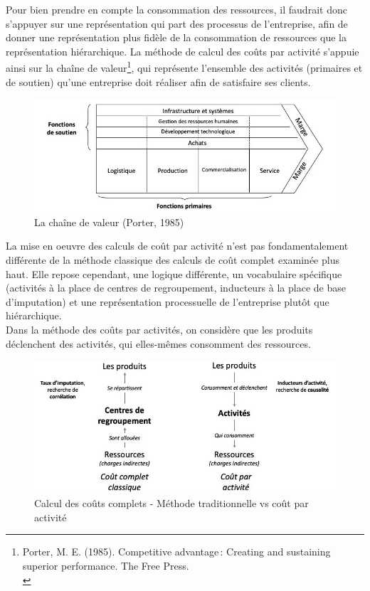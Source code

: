 \documentclass{kaobook}
\begin{document}
Pour bien prendre en compte la consommation des ressources, il faudrait donc s'appuyer sur une représentation qui part des processus de l'entreprise, afin de donner une représentation plus fidèle de la consommation de ressources que la représentation hiérarchique. La méthode de calcul des coûts par activité s'appuie ainsi sur la chaîne de valeur\footnote{Porter, M. E. (1985). Competitive advantage : Creating and sustaining superior performance. The Free Press.\\}, qui représente l'ensemble des activités (primaires et de soutien) qu'une entreprise doit réaliser afin de satisfaire ses clients.\\

\begin{figure}[htbp]
\centering
\includegraphics[width=.9\linewidth]{./img/chaine.jpeg}
\caption{La chaîne de valeur (Porter, 1985)}
\end{figure}

La mise en oeuvre des calculs de coût par activité n'est pas fondamentalement différente de la méthode classique des calculs de coût complet examinée plus haut. Elle repose cependant, une logique différente, un vocabulaire spécifique (activités à la place de centres de regroupement, inducteurs à la place de base d'imputation) et une représentation processuelle de l’entreprise plutôt que hiérarchique.\\

Dans la méthode des coûts par activités, on considère que les produits déclenchent des activités, qui elles-mêmes consomment des ressources.\\

\begin{figure}[htbp]
\centering
\includegraphics[width=.9\linewidth]{./img/abc.jpeg}
\caption{Calcul des coûts complets - Méthode traditionnelle vs coût par activité}
\end{figure}
\end{document}
